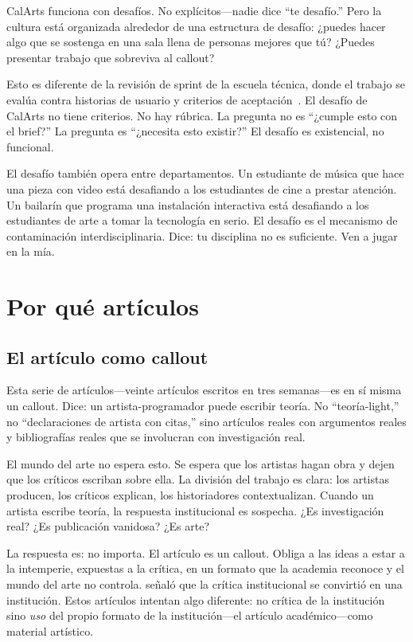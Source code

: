 \documentclass[10pt,letterpaper,twocolumn]{article}
\begin{document}
CalArts funciona con desafíos. No explícitos---nadie dice ``te desafío.'' Pero la cultura está organizada alrededor de una estructura de desafío: ¿puedes hacer algo que se sostenga en una sala llena de personas mejores que tú? ¿Puedes presentar trabajo que sobreviva al callout?

Esto es diferente de la revisión de sprint de la escuela técnica, donde el trabajo se evalúa contra historias de usuario y criterios de aceptación~\citep{vinsel2020innovation}. El desafío de CalArts no tiene criterios. No hay rúbrica. La pregunta no es ``¿cumple esto con el brief?'' La pregunta es ``¿necesita esto existir?'' El desafío es existencial, no funcional.

El desafío también opera entre departamentos. Un estudiante de música que hace una pieza con video está desafiando a los estudiantes de cine a prestar atención. Un bailarín que programa una instalación interactiva está desafiando a los estudiantes de arte a tomar la tecnología en serio. El desafío es el mecanismo de contaminación interdisciplinaria. Dice: tu disciplina no es suficiente. Ven a jugar en la mía.

\section{Por qué artículos}

\subsection{El artículo como callout}

Esta serie de artículos---veinte artículos escritos en tres semanas---es en sí misma un callout. Dice: un artista-programador puede escribir teoría. No ``teoría-light,'' no ``declaraciones de artista con citas,'' sino artículos reales con argumentos reales y bibliografías reales que se involucran con investigación real.

El mundo del arte no espera esto. Se espera que los artistas hagan obra y dejen que los críticos escriban sobre ella. La división del trabajo es clara: los artistas producen, los críticos explican, los historiadores contextualizan. Cuando un artista escribe teoría, la respuesta institucional es sospecha. ¿Es investigación real? ¿Es publicación vanidosa? ¿Es arte?

La respuesta es: no importa. El artículo es un callout. Obliga a las ideas a estar a la intemperie, expuestas a la crítica, en un formato que la academia reconoce y el mundo del arte no controla. \citet{fraser2005critique} señaló que la crítica institucional se convirtió en una institución. Estos artículos intentan algo diferente: no crítica de la institución sino \emph{uso} del propio formato de la institución---el artículo académico---como material artístico.
\end{document}
